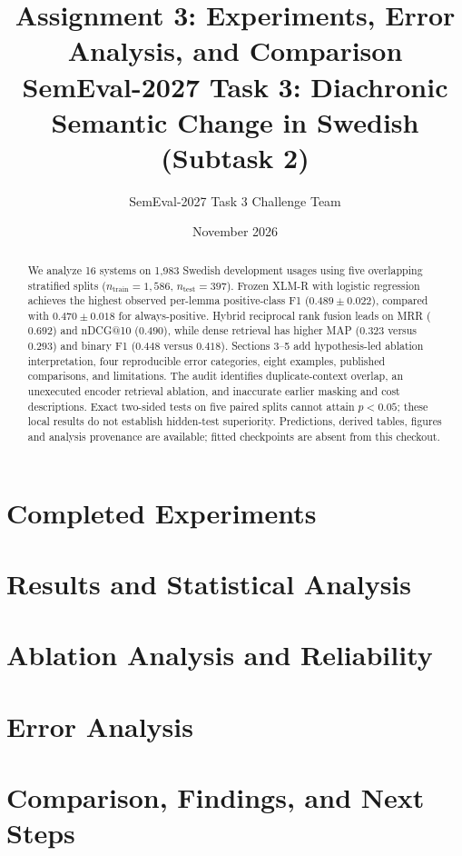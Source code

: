 \documentclass[11pt,a4paper]{article}
\title{\textbf{Assignment 3: Experiments, Error Analysis, and Comparison}\\
\large SemEval-2027 Task 3: Diachronic Semantic Change in Swedish (Subtask 2)}
\author{SemEval-2027 Task 3 Challenge Team}
\date{November 2026}
\begin{document}
\maketitle

\begin{abstract}
We analyze 16 systems on 1,983 Swedish development usages using five overlapping stratified splits ($n_{\text{train}}=1,586$, $n_{\text{test}}=397$). Frozen XLM-R with logistic regression achieves the highest observed per-lemma positive-class F1 ($0.489\pm0.022$), compared with $0.470\pm0.018$ for always-positive. Hybrid reciprocal rank fusion leads on MRR ($0.692$) and nDCG@10 ($0.490$), while dense retrieval has higher MAP ($0.323$ versus $0.293$) and binary F1 ($0.448$ versus $0.418$). Sections 3--5 add hypothesis-led ablation interpretation, four reproducible error categories, eight examples, published comparisons, and limitations. The audit identifies duplicate-context overlap, an unexecuted encoder retrieval ablation, and inaccurate earlier masking and cost descriptions. Exact two-sided tests on five paired splits cannot attain $p<0.05$; these local results do not establish hidden-test superiority. Predictions, derived tables, figures and analysis provenance are available; fitted checkpoints are absent from this checkout.
\end{abstract}

\section{Completed Experiments}


\section{Results and Statistical Analysis}


\section{Ablation Analysis and Reliability}


\section{Error Analysis}


\section{Comparison, Findings, and Next Steps}


\nocite{cormack2009reciprocal,wang2024multilingual,conneau2019unsupervised,schlechtweg2020semeval}


\end{document}
